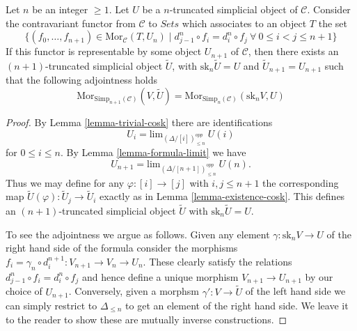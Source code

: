 \begin{lemma}
\label{lemma-work-out}
Let $n$ be an integer $\geq 1$. Let $U$ be a $n$-truncated
simplicial object of $\mathcal{C}$. Consider the
contravariant functor from $\mathcal{C}$ to $\textit{Sets}$
which associates to an object $T$ the set
$$
\{ (f_0, \ldots, f_{n + 1}) \in \text{Mor}_{\mathcal{C}}(T, U_n)
\mid
d^n_{j - 1} \circ f_i = d^n_i \circ f_j\ 
\forall\ 0\leq i < j\leq n + 1\}
$$
If this functor is representable by some object $U_{n + 1}$
of $\mathcal{C}$, then there exists an $(n + 1)$-truncated
simplicial object $\tilde U$, with $\text{sk}_n \tilde U = U$
and $\tilde U_{n + 1} = U_{n + 1}$ such that the following
adjointness holds
$$
\text{Mor}_{\text{Simp}_{n + 1}(\mathcal{C})}(V, \tilde U)
=
\text{Mor}_{\text{Simp}_n(\mathcal{C})}(\text{sk}_nV, U)
$$
\end{lemma}

\begin{proof}
By Lemma \ref{lemma-trivial-cosk} there are identifications
$$
U_i = \text{lim}_{(\Delta/[i])_{\leq n}^{opp}}\ U(i)
$$
for $0 \leq i \leq n$. By Lemma \ref{lemma-formula-limit}
we have
$$
U_{n + 1} = \text{lim}_{(\Delta/[n + 1])_{\leq n}^{opp}}\ U(n).
$$
Thus we may define for any $\varphi : [i] \to [j]$
with $i, j \leq n + 1$ the corresponding map
$\tilde U(\varphi) : \tilde U_j \to \tilde U_i$ exactly as
in Lemma \ref{lemma-existence-cosk}. This defines
an $(n + 1)$-truncated simplicial object $\tilde U$
with $\text{sk}_n \tilde U = U$.

\medskip\noindent
To see the adjointness we argue as follows. Given any element
$\gamma : \text{sk}_n V \to U$ of the right hand side of the formula
consider the morphisms
$f_i = \gamma_n \circ d^{n + 1}_i : V_{n + 1} \to V_n \to U_n$.
These clearly satisfy the relations $d^n_{j - 1} \circ f_i = d^n_i \circ f_j$
and hence define a unique morphism $V_{n + 1} \to U_{n + 1}$
by our choice of $U_{n + 1}$.
Conversely, given a morphsm $\gamma' : V \to \tilde U$
of the left hand side we can simply restrict to
$\Delta_{\leq n}$ to get an element of the right hand side.
We leave it to the reader to show these are mutually inverse
constructions.
\end{proof}

